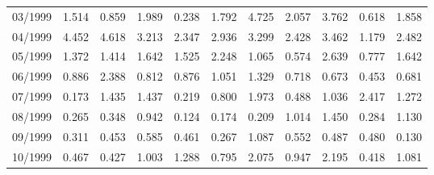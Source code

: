 \begin{tabular}{lrrrrrrrrrr}
03/1999 &  1.514 &  0.859 &  1.989 &  0.238 &  1.792 &  4.725 &  2.057 &  3.762 &  0.618 &  1.858 \\
04/1999 &  4.452 &  4.618 &  3.213 &  2.347 &  2.936 &  3.299 &  2.428 &  3.462 &  1.179 &  2.482 \\
05/1999 &  1.372 &  1.414 &  1.642 &  1.525 &  2.248 &  1.065 &  0.574 &  2.639 &  0.777 &  1.642 \\
06/1999 &  0.886 &  2.388 &  0.812 &  0.876 &  1.051 &  1.329 &  0.718 &  0.673 &  0.453 &  0.681 \\
07/1999 &  0.173 &  1.435 &  1.437 &  0.219 &  0.800 &  1.973 &  0.488 &  1.036 &  2.417 &  1.272 \\
08/1999 &  0.265 &  0.348 &  0.942 &  0.124 &  0.174 &  0.209 &  1.014 &  1.450 &  0.284 &  1.130 \\
09/1999 &  0.311 &  0.453 &  0.585 &  0.461 &  0.267 &  1.087 &  0.552 &  0.487 &  0.480 &  0.130 \\
10/1999 &  0.467 &  0.427 &  1.003 &  1.288 &  0.795 &  2.075 &  0.947 &  2.195 &  0.418 &  1.081 \\
\bottomrule
\end{tabular}
